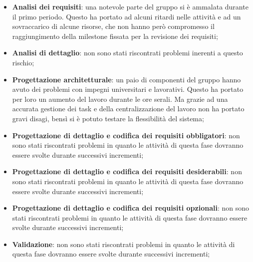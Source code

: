 			\begin{itemize}
				\item \textbf{Analisi dei requisiti}: una notevole parte del gruppo si è ammalata durante il primo periodo. Questo ha portato ad alcuni ritardi nelle attività e ad un sovraccarico di alcune risorse, che non hanno però compromesso il raggiungimento della milestone fissata per la revisione dei requisiti;
				\item \textbf{Analisi di dettaglio}: non sono stati riscontrati problemi inerenti a questo rischio;
				\item \textbf{Progettazione architetturale}: un paio di componenti del gruppo hanno avuto dei problemi con impegni universitari e lavorativi. Questo ha portato per loro un aumento del lavoro durante le ore serali. Ma grazie ad una accurata gestione dei task e della centralizzazione del lavoro non ha portato gravi disagi, bensì si è potuto testare la flessibilità del sistema;
				\item \textbf{Progettazione di dettaglio e codifica dei requisiti obbligatori}: non sono stati riscontrati problemi in quanto le attività di questa fase dovranno essere svolte durante successivi incrementi;
				\item \textbf{Progettazione di dettaglio e codifica dei requisiti desiderabili}: non sono stati riscontrati problemi in quanto le attività di questa fase dovranno essere svolte durante successivi incrementi;
				\item \textbf{Progettazione di dettaglio e codifica dei requisiti opzionali}: non sono stati riscontrati problemi in quanto le attività di questa fase dovranno essere svolte durante successivi incrementi;
				\item \textbf{Validazione}: non sono stati riscontrati problemi in quanto le attività di questa fase dovranno essere svolte durante successivi incrementi;
			\end{itemize}

